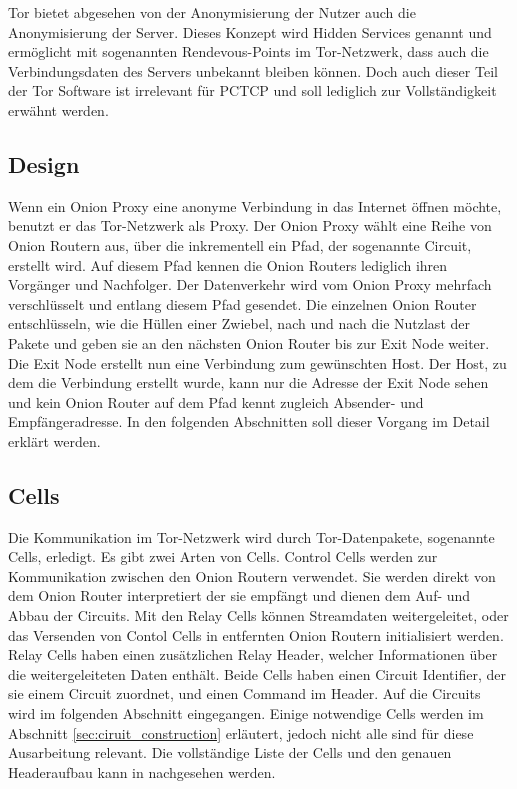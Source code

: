 \documentclass[fleqn,envcountsame,runningheads,10pt,a4paper]{llncs}
\begin{document}
Tor bietet abgesehen von der Anonymisierung der Nutzer auch die Anonymisierung 
der Server. Dieses Konzept wird Hidden Services genannt und ermöglicht mit 
sogenannten Rendevous-Points im Tor-Netzwerk, dass auch die 
Verbindungsdaten des Servers unbekannt bleiben können. Doch auch dieser Teil der 
Tor Software ist irrelevant für PCTCP und soll lediglich zur Vollständigkeit 
erwähnt werden.

\subsection{Design}

Wenn ein Onion Proxy eine anonyme Verbindung in das Internet öffnen möchte, 
benutzt er das Tor-Netzwerk als Proxy. Der Onion Proxy wählt eine Reihe 
von Onion Routern aus, über die inkrementell ein Pfad, der sogenannte Circuit, 
erstellt wird. Auf diesem Pfad kennen die Onion Routers lediglich ihren 
Vorgänger und Nachfolger. Der Datenverkehr wird vom Onion Proxy mehrfach 
verschlüsselt und entlang diesem Pfad gesendet. Die einzelnen Onion Router 
entschlüsseln, wie die Hüllen einer Zwiebel, nach und nach die Nutzlast der 
Pakete und geben sie an den nächsten Onion Router bis zur Exit Node weiter. Die 
Exit Node erstellt nun eine Verbindung zum gewünschten Host. Der Host, zu dem 
die Verbindung erstellt wurde, kann nur die Adresse der Exit Node sehen und kein 
Onion Router auf dem Pfad kennt zugleich Absender- und Empfängeradresse. In den 
folgenden Abschnitten soll dieser Vorgang im Detail erklärt werden.

\subsection{Cells}

Die Kommunikation im Tor-Netzwerk wird durch Tor-Datenpakete, sogenannte Cells, 
erledigt. Es gibt zwei Arten von Cells. Control Cells werden zur Kommunikation 
zwischen den Onion Routern verwendet. Sie werden direkt von dem Onion Router 
interpretiert der sie empfängt und dienen dem Auf- und Abbau der Circuits. Mit 
den Relay Cells können Streamdaten weitergeleitet, oder das Versenden von Contol 
Cells in entfernten Onion Routern initialisiert werden. Relay Cells haben einen 
zusätzlichen Relay Header, welcher Informationen über die weitergeleiteten Daten 
enthält. Beide Cells haben einen Circuit Identifier, der sie einem Circuit 
zuordnet, und einen Command im Header. Auf die Circuits wird im folgenden 
Abschnitt eingegangen. Einige notwendige Cells werden im Abschnitt 
\ref{sec:ciruit_construction} erläutert, jedoch nicht alle sind für diese 
Ausarbeitung relevant. Die vollständige Liste der Cells und den genauen 
Headeraufbau kann in \cite{tor} nachgesehen werden.
\end{document}
